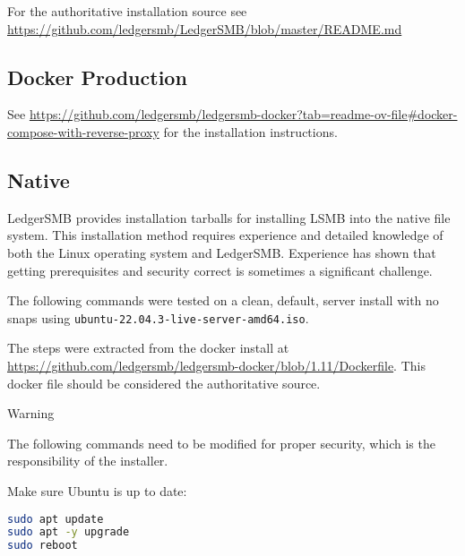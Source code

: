 For the authoritative installation source see \url{https://github.com/ledgersmb/LedgerSMB/blob/master/README.md}

\subsection{Docker Production}
\label{sub-installation-docker-production}

See \url{https://github.com/ledgersmb/ledgersmb-docker?tab=readme-ov-file#docker-compose-with-reverse-proxy} for the installation instructions.

\subsection{Native}
\label{sub-installation-native}

LedgerSMB provides  installation tarballs for installing LSMB into the native file system.
This installation method requires experience and detailed knowledge of both the Linux operating system and LedgerSMB.
Experience has shown that getting prerequisites and security correct is sometimes a significant challenge.

The following commands were tested on a clean, default, server install with no snaps using \texttt{ubuntu-22.04.3-live-server-amd64.iso}.

The steps were extracted from the docker install at \url{https://github.com/ledgersmb/ledgersmb-docker/blob/1.11/Dockerfile}. 
This docker file should be considered the authoritative source.

\vspace{5mm}
\begin{center}
    \large{Warning}
    
    \large{The following commands need to be modified for proper security, which is the responsibility of the installer.}
\end{center}
\vspace{5mm}

Make sure Ubuntu is up to date:
\begin{lstlisting}[language=sh, basicstyle=\small\ttfamily, breaklines=true,frame=none,backgroundcolor=\color{ghostwhite}]
sudo apt update
sudo apt -y upgrade
sudo reboot
\end{lstlisting}

